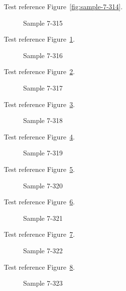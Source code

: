 Test reference Figure~\ref{fig:sample-7-314}.

\begin{figure}[tbhp]
\caption{Sample 7-315}
\label{fig:sample-7-315}
\end{figure}

Test reference Figure~\ref{fig:sample-7-315}.

\begin{figure}[tbhp]
\caption{Sample 7-316}
\label{fig:sample-7-316}
\end{figure}

Test reference Figure~\ref{fig:sample-7-316}.

\begin{figure}[tbhp]
\caption{Sample 7-317}
\label{fig:sample-7-317}
\end{figure}

Test reference Figure~\ref{fig:sample-7-317}.

\begin{figure}[tbhp]
\caption{Sample 7-318}
\label{fig:sample-7-318}
\end{figure}

Test reference Figure~\ref{fig:sample-7-318}.

\begin{figure}[tbhp]
\caption{Sample 7-319}
\label{fig:sample-7-319}
\end{figure}

Test reference Figure~\ref{fig:sample-7-319}.

\begin{figure}[tbhp]
\caption{Sample 7-320}
\label{fig:sample-7-320}
\end{figure}

Test reference Figure~\ref{fig:sample-7-320}.

\begin{figure}[tbhp]
\caption{Sample 7-321}
\label{fig:sample-7-321}
\end{figure}

Test reference Figure~\ref{fig:sample-7-321}.

\begin{figure}[tbhp]
\caption{Sample 7-322}
\label{fig:sample-7-322}
\end{figure}

Test reference Figure~\ref{fig:sample-7-322}.

\begin{figure}[tbhp]
\caption{Sample 7-323}
\label{fig:sample-7-323}
\end{figure}

